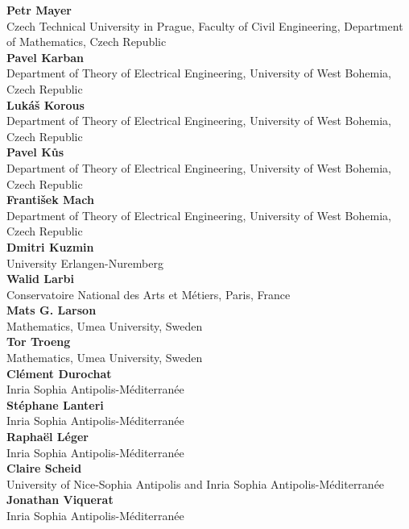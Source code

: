 \documentclass[article,A4,11pt]{llncs}%
\begin{document}
        \noindent
    {\bf Petr Mayer}\\
    Czech Technical University in Prague, Faculty of Civil Engineering, Department of Mathematics, Czech Republic\\
        \noindent
    {\bf Pavel Karban}\\
    Department of Theory of Electrical Engineering, University of West Bohemia, Czech Republic\\
        \noindent
    {\bf Lukáš Korous}\\
    Department of Theory of Electrical Engineering, University of West Bohemia, Czech Republic\\
        \noindent
    {\bf Pavel Kůs}\\
    Department of Theory of Electrical Engineering, University of West Bohemia, Czech Republic\\
        \noindent
    {\bf František Mach}\\
    Department of Theory of Electrical Engineering, University of West Bohemia, Czech Republic\\
        \noindent
    {\bf Dmitri Kuzmin}\\
    University Erlangen-Nuremberg\\
        \noindent
    {\bf Walid Larbi}\\
    Conservatoire National des Arts et M\'{e}tiers, Paris, France\\
        \noindent
    {\bf Mats G. Larson}\\
    Mathematics, Umea University, Sweden\\
        \noindent
    {\bf Tor Troeng}\\
    Mathematics, Umea University, Sweden\\
        \noindent
    {\bf Clément Durochat}\\
    Inria Sophia Antipolis-Méditerranée\\
        \noindent
    {\bf Stéphane Lanteri}\\
    Inria Sophia Antipolis-Méditerranée\\
        \noindent
    {\bf Raphaël Léger}\\
    Inria Sophia Antipolis-Méditerranée\\
        \noindent
    {\bf Claire Scheid}\\
    University of Nice-Sophia Antipolis and Inria Sophia Antipolis-Méditerranée\\
        \noindent
    {\bf Jonathan Viquerat}\\
    Inria Sophia Antipolis-Méditerranée\\
\end{document}

